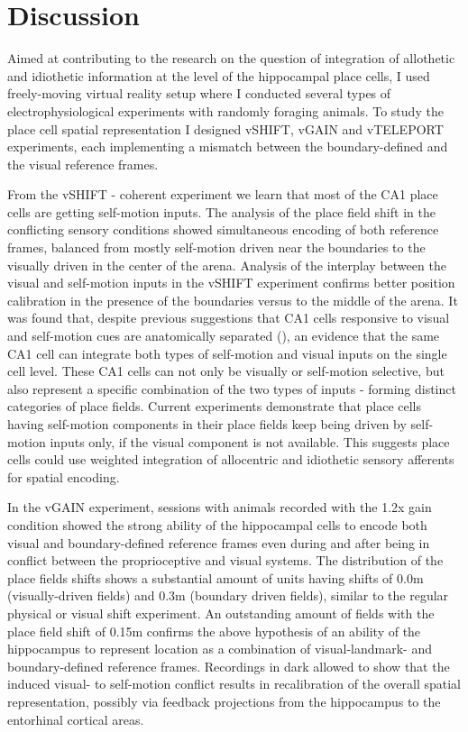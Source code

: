 \chapter{Discussion}
\label{ch:discussion}

Aimed at contributing to the research on the question of integration of allothetic and idiothetic information at the level of the hippocampal place cells, I used freely-moving virtual reality setup where I conducted several types of electrophysiological experiments with randomly foraging animals. To study the place cell spatial representation I designed vSHIFT, vGAIN and vTELEPORT experiments, each implementing a mismatch between the boundary-defined and the visual reference frames.

From the vSHIFT - coherent experiment we learn that most of the CA1 place cells are getting self-motion inputs. The analysis of the place field shift in the conflicting sensory conditions showed simultaneous encoding of both reference frames, balanced from mostly self-motion driven near the boundaries to the visually driven in the center of the arena. Analysis of the interplay between the visual and self-motion inputs in the vSHIFT experiment confirms better position calibration in the presence of the boundaries versus to the middle of the arena. It was found that, despite previous suggestions that CA1 cells responsive to visual and self-motion cues are anatomically separated (\cite{Fattahi2018}), an evidence that the same CA1 cell can integrate both types of self-motion and visual inputs on the single cell level. These CA1 cells can not only be visually or self-motion selective, but also represent a specific combination of the two types of inputs - forming distinct categories of place fields. Current experiments demonstrate that place cells having self-motion components in their place fields keep being driven by self-motion inputs only, if the visual component is not available. This suggests place cells could use weighted integration of allocentric and idiothetic sensory afferents for spatial encoding.

In the vGAIN experiment, sessions with animals recorded with the 1.2x gain condition showed the strong ability of the hippocampal cells to encode both visual and boundary-defined reference frames even during and after being in conflict between the proprioceptive and visual systems. The distribution of the place fields shifts shows a substantial amount of units having shifts of 0.0m (visually-driven fields) and 0.3m (boundary driven fields), similar to the regular physical or visual shift experiment. An outstanding amount of fields with the place field shift of 0.15m confirms the above hypothesis of an ability of the hippocampus to represent location as a combination of visual-landmark- and boundary-defined reference frames. Recordings in dark allowed to show that the induced visual- to self-motion conflict results in recalibration of the overall spatial representation, possibly via feedback projections from the hippocampus to the entorhinal cortical areas.

